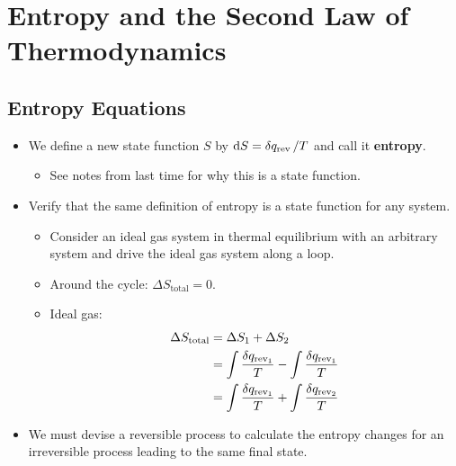 \documentclass[../notes.tex]{subfiles}
\begin{document}
\chapter{Entropy and the Second Law of Thermodynamics}
\section{Entropy Equations}
\begin{itemize}
    \item {}We define a new state function $S$ by $\dd{S}=\var{q_\text{rev}}/T$ and call it \textbf{entropy}.
    \begin{itemize}
        \item See notes from last time for why this is a state function.
    \end{itemize}
    \item Verify that the same definition of entropy is a state function for any system.
    \begin{itemize}
        \item Consider an ideal gas system in thermal equilibrium with an arbitrary system and drive the ideal gas system along a loop.
        \item Around the cycle: $\Delta S_\text{total}=0$.
        \item Ideal gas:
        \begin{align*}
            \Delta S_\text{total} &= \Delta S_1+\Delta S_2\\
            &= \int\frac{\var{q_{\text{rev}_1}}}{T}-\int\frac{\var{q_{\text{rev}_1}}}{T}\\
            &= \int\frac{\var{q_{\text{rev}_1}}}{T}+\int\frac{\var{q_{\text{rev}_2}}}{T}
        \end{align*}
    \end{itemize}
    \item We must devise a reversible process to calculate the entropy changes for an irreversible process leading to the same final state.
    \begin{figure}[h!]
        \centering
\end{figure}
\end{itemize}
\end{document}
